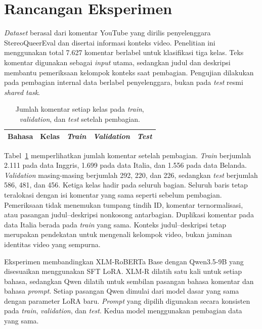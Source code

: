 \documentclass[11pt]{article}
\begin{document}
\section{Rancangan Eksperimen}
\textit{Dataset} berasal dari komentar YouTube yang dirilis penyelenggara StereoQueerEval dan disertai informasi konteks video. Penelitian ini menggunakan total 7.627 komentar berlabel untuk klasifikasi tiga kelas. Teks komentar digunakan sebagai \textit{input} utama, sedangkan judul dan deskripsi membantu pemeriksaan kelompok konteks saat pembagian. Pengujian dilakukan pada pembagian internal data berlabel penyelenggara, bukan pada \textit{test} resmi \textit{shared task}.

\begin{table}[ht]
\centering
\small
\setlength{\tabcolsep}{3pt}
\begin{tabular}{llrrr}
\toprule
Bahasa & Kelas & \textit{Train} & \textit{Validation} & \textit{Test} \\
\midrule

\end{tabular}
\caption{Jumlah komentar setiap kelas pada \textit{train}, \textit{validation}, dan \textit{test} setelah pembagian.}
\label{tab:split}
\end{table}

Tabel~\ref{tab:split} memperlihatkan jumlah komentar setelah pembagian. \textit{Train} berjumlah 2.111 pada data Inggris, 1.699 pada data Italia, dan 1.556 pada data Belanda. \textit{Validation} masing-masing berjumlah 292, 220, dan 226, sedangkan \textit{test} berjumlah 586, 481, dan 456. Ketiga kelas hadir pada seluruh bagian. Seluruh baris tetap teralokasi dengan isi komentar yang sama seperti sebelum pembagian. Pemeriksaan tidak menemukan tumpang tindih ID, komentar ternormalisasi, atau pasangan judul--deskripsi nonkosong antarbagian. Duplikasi komentar pada data Italia berada pada \textit{train} yang sama. Konteks judul--deskripsi tetap merupakan pendekatan untuk mengenali kelompok video, bukan jaminan identitas video yang sempurna.


Eksperimen membandingkan XLM-RoBERTa Base dengan Qwen3.5-9B yang disesuaikan menggunakan SFT LoRA. XLM-R dilatih satu kali untuk setiap bahasa, sedangkan Qwen dilatih untuk sembilan pasangan bahasa komentar dan bahasa \textit{prompt}. Setiap pasangan Qwen dimulai dari model dasar yang sama dengan parameter LoRA baru. \textit{Prompt} yang dipilih digunakan secara konsisten pada \textit{train}, \textit{validation}, dan \textit{test}. Kedua model menggunakan pembagian data yang sama.
\end{document}
